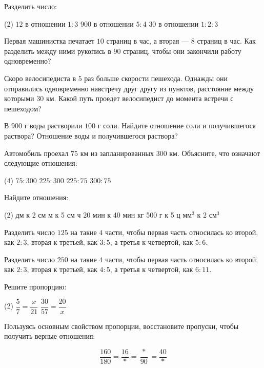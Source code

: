 \begin{class}[number=5]
	\begin{listofex}
	\item Разделить число:
	\begin{tasks}(2)
		\task \( 12 \) в отношении \( 1:3 \)
		\task \( 900 \) в отношении \( 5:4 \)
		\task \( 30 \) в отношении \( 1:2:3 \)
	\end{tasks}
	\item Первая машинистка печатает \( 10 \) страниц в час, а вторая --- \( 8 \) страниц в час. Как разделить между ними рукопись в \( 90 \) страниц, чтобы они закончили работу одновременно?
	\item Скоро велосипедиста в \( 5 \) раз больше скорости пешехода. Однажды они отправились одновременно навстречу друг другу из пунктов, расстояние между которыми \( 30 \) км. Какой путь проедет велосипедист до момента встречи с пешеходом?
	\item В \( 900 \) г воды растворили \( 100 \) г соли. Найдите отношение соли и получившегося раствора? Отношение воды и получившегося раствора?
	\item Автомобиль проехал \( 75 \) км из запланированных \( 300 \) км. Объясните, что означают следующие отношения:
	\begin{tasks}(4)
		\task \( 75:300 \)
		\task \( 225:300 \)
		\task \( 225:75 \)
		\task \( 300:75 \)
	\end{tasks}
	\item Найдите отношения:
	\begin{tasks}(2)
		 дм к 2 см
		 м к 5 см
		 ч 20 мин к 40 мин
		 кг 500 г к 5 ц
		 мм\( ^3 \) к 2 см\( ^3 \)
	\end{tasks}
	\item Разделить число \( 125 \) на такие \( 4 \) части, чтобы первая часть относилась ко второй, как \( 2:3 \), вторая к третьей, как \( 3:5 \), а третья к четвертой, как \( 5:6 \).
	\item Разделить число \( 250 \) на такие \( 4 \) части, чтобы первая часть относилась ко второй, как \( 2:3 \), вторая к третьей, как \( 4:5 \), а третья к четвертой, как \( 6:11 \).
	\item Решите пропорцию:
	\begin{tasks}(2)
		\task \( \dfrac{5}{7}=\dfrac{x}{21} \)
		\task \( \dfrac{30}{57}=\dfrac{20}{x} \)
	\end{tasks}
	\item Пользуясь основным свойством пропорции, восстановите пропуски, чтобы получить верные отношения:
	
	\[ \dfrac{160}{180}=\dfrac{16}{*}=\dfrac{*}{90}=\dfrac{40}{*} \]
	\end{listofex}
\end{class}

